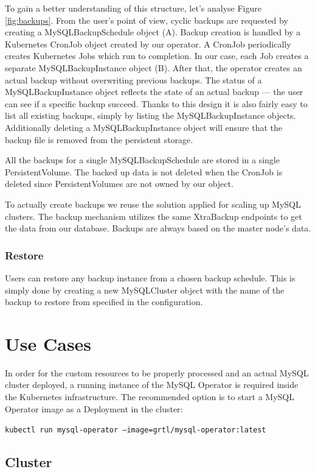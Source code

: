To gain a better understanding of this structure, let's analyse Figure
\ref{fig:backups}. From the user's point of view, cyclic backups are requested
by creating a MySQLBackupSchedule object (A). Backup creation is handled
by a Kubernetes CronJob object created by our operator. A CronJob periodically
creates Kubernetes Jobs which run to completion. In our case, each
Job creates a separate MySQLBackupInstance object (B). After that, the
operator creates an actual backup without overwriting previous
backups. The status of a MySQLBackupInstance object reflects the state of
an actual backup --- the user can see if a specific backup succeed. Thanks
to this design it is also fairly easy to list all existing backups,
simply by listing the MySQLBackupInstance objects. Additionally deleting a
MySQLBackupInstance object will ensure that the backup file is removed from
the persistent storage.

All the backups for a single MySQLBackupSchedule are stored in a single
PersistentVolume. The backed up data is not deleted when the CronJob is
deleted since PersistentVolumes are not owned by our object.

To actually create backups we reuse the solution applied for scaling
up MySQL clusters. The backup mechanism utilizes the same XtraBackup endpoints
to get the data from our database. Backups are always based on the master
node's data.

\subsubsection*{Restore}
Users can restore any backup instance from a chosen backup schedule. This is simply done by creating
a new MySQLCluster object with the name of the backup to restore from specified in the
configuration.

\section{Use Cases}
In order for the custom resources to be properly processed and an actual MySQL cluster deployed, a
running instance of the MySQL Operator is required inside the Kubernetes infrastructure. The
recommended option is to start a MySQL Operator image as a Deployment in the cluster:

\texttt{kubectl run mysql-operator --image=grtl/mysql-operator:latest}

\subsection{Cluster}
